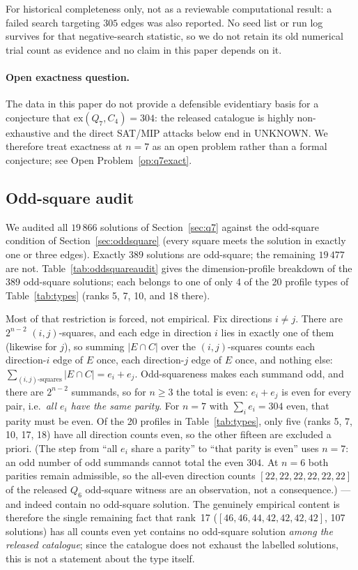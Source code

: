 \documentclass[12pt]{article}
\newcommand{\ex}{\mathrm{ex}}
\begin{document}
For historical completeness only, not as a reviewable computational
result: a failed search targeting $305$ edges was also reported. No seed list
or run log survives for that negative-search statistic, so we do not retain
its old numerical trial count as evidence and no claim in this paper depends
on it.

\paragraph{Open exactness question.}
The data in this paper do not provide a defensible evidentiary basis for a
conjecture that $\ex(Q_7,C_4)=304$: the released catalogue is highly
non-exhaustive and the direct SAT/MIP attacks below end in UNKNOWN. We
therefore treat exactness at $n=7$ as an open problem rather than a formal
conjecture; see Open Problem~\ref{op:q7exact}.

\subsection{Odd-square audit}\label{sec:oddsquareaudit}

We audited all $19\,866$ solutions of Section~\ref{sec:q7} against the
odd-square condition of Section~\ref{sec:oddsquare} (every square meets the
solution in exactly one or three edges). Exactly $389$ solutions are
odd-square; the remaining $19\,477$ are not. Table~\ref{tab:oddsquareaudit}
gives the dimension-profile breakdown of the 389 odd-square solutions; each
belongs to one of only 4 of the 20 profile types of
Table~\ref{tab:types} (ranks 5, 7, 10, and 18 there).

Most of that restriction is forced, not empirical. Fix directions $i\ne j$.
There are $2^{n-2}$ $(i,j)$-squares, and each edge in direction $i$ lies in
exactly one of them (likewise for $j$), so summing $|E\cap C|$ over the
$(i,j)$-squares counts each direction-$i$ edge of $E$ once, each
direction-$j$ edge of $E$ once, and nothing else:
$\sum_{(i,j)\text{-squares}}|E\cap C|=e_i+e_j$. Odd-squareness makes each
summand odd, and there are $2^{n-2}$ summands, so for $n\ge3$ the total is
even: $e_i+e_j$ is even for every pair, i.e.\ \emph{all $e_i$ have the same
parity}. For $n=7$ with $\sum_ie_i=304$ even, that parity must be even. Of the
20 profiles in Table~\ref{tab:types}, only five (ranks 5, 7, 10, 17, 18) have
all direction counts even, so the other fifteen are excluded a priori.
(The step from ``all $e_i$ share a parity'' to ``that parity is even'' uses
$n=7$: an odd number of odd summands cannot total the even $304$. At $n=6$ both
parities remain admissible, so the all-even direction counts
$[22,22,22,22,22,22]$ of the released $Q_6$ odd-square witness are an
observation, not a consequence.) --- and
indeed contain no odd-square solution. The genuinely empirical content is
therefore the single remaining fact that rank~17
($[46,46,44,42,42,42,42]$, 107 solutions) has all counts even yet contains no
odd-square solution \emph{among the released catalogue}; since the catalogue
does not exhaust the labelled solutions, this is not a statement about the
type itself.
\end{document}
